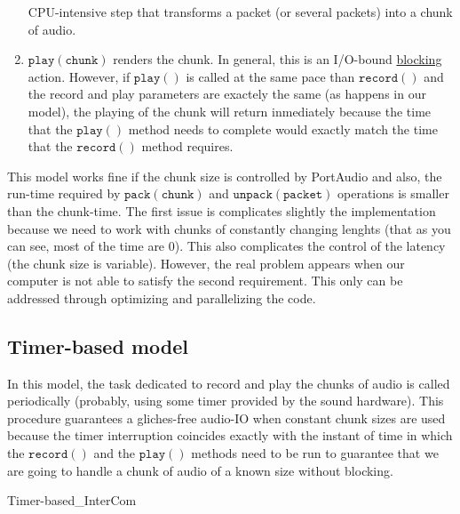 \begin{enumerate}
  CPU-intensive step that transforms a packet (or several packets)
  into a chunk of audio.
\item $\mathtt{play(chunk)}$ renders the chunk. In general, this is an
  I/O-bound
  \href{https://python-sounddevice.readthedocs.io/en/0.4.0/api/streams.html#sounddevice.Stream.write}{blocking}
  action. However, if $\mathtt{play()}$ is called at the same pace
  than $\mathtt{record()}$ and the record and play parameters are
  exactely the same (as happens in our model), the playing of the
  chunk will return inmediately because the time that the
  $\mathtt{play()}$ method needs to complete would exactly match the
  time that the $\mathtt{record()}$ method requires.
\end{enumerate}

This model works fine if the chunk size is controlled by PortAudio and
also, the run-time required by $\mathtt{pack(chunk)}$ and
$\mathtt{unpack(packet)}$ operations is smaller than the
chunk-time. The first issue is complicates slightly the implementation
because we need to work with chunks of constantly changing lenghts
(that as you can see, most of the time are 0). This also complicates
the control of the latency (the chunk size is variable). However, the
real problem appears when our computer is not able to satisfy the
second requirement. This only can be addressed through optimizing and
parallelizing the code.

\subsection{Timer-based model}

In this model, the task dedicated to record and play the chunks of
audio is called periodically (probably, using some timer provided by
the sound hardware). This procedure guarantees a gliches-free audio-IO
when constant chunk sizes are used because the timer interruption
coincides exactly with the instant of time in which the
$\mathtt{record()}$ and the $\mathtt{play()}$ methods need to be run
to guarantee that we are going to handle a chunk of audio of a known
size without blocking.

\begin{pseudocode}{Timer-based\_InterCom}{~}
  \BEGIN
     \GETS {}\\
     \GETS {}\\
    \\
     \GETS {}\\
     \GETS {}\\
  \END
  \ENDPROCEDURE
\end{pseudocode}


